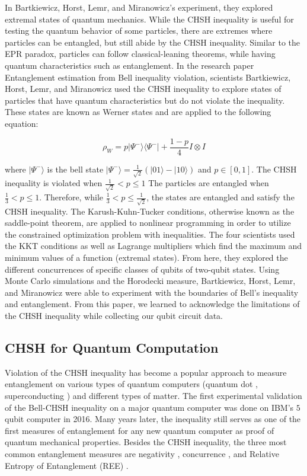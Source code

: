 \documentclass{article}
\begin{document}
In Bartkiewicz, Horst, Lemr, and Miranowicz’s experiment, they explored extremal states of quantum mechanics. While the CHSH inequality is useful for testing the quantum behavior of some particles, there are extremes where particles can be entangled, but still abide by the CHSH inequality. Similar to the EPR paradox, particles can follow classical-leaning theorems, while having quantum characteristics such as entanglement. 
In the research paper Entanglement estimation from Bell inequality violation, scientists Bartkiewicz, Horst, Lemr, and Miranowicz used the CHSH inequality to explore states of 
particles that have quantum characteristics but do not violate the inequality. These states are known as Werner states and are applied to the following equation: 

$$\rho_W = p|\Psi^-\rangle \langle\Psi^-| + \frac{1 - p}{4}I \otimes I$$

where $|\Psi^-\rangle$ is the bell state $|\Psi^-\rangle = \frac{1}{\sqrt{2}} (|01\rangle - |10\rangle)$ and $p \in [0,1]$. 
 The CHSH inequality is violated when 
$\frac{1}{\sqrt{2}} < p \leq 1$
The particles are entangled when 
$\frac{1}{3} < p \leq 1$.
Therefore, while $\frac{1}{3} < p \leq \frac{1}{\sqrt{2}}$, the states are entangled and satisfy the CHSH inequality. 
The Karush-Kuhn-Tucker conditions, otherwise known as the saddle-point theorem, are applied to nonlinear programming in order to utilize the constrained optimization problem with inequalities. The four scientists used the KKT conditions as well as Lagrange multipliers which find the maximum and minimum values of a function (extremal states). From here, they explored the different concurrences of specific classes of qubits of two-qubit states. Using Monte Carlo simulations and the Horodecki measure, Bartkiewicz, Horst, Lemr, and Miranowicz were able to experiment with the boundaries of Bell’s inequality and entanglement. 
From this paper, we learned to acknowledge the limitations of the CHSH inequality while collecting our qubit circuit data. 

\subsection{CHSH for Quantum Computation}

Violation of the CHSH inequality has become a popular approach to measure entanglement on various types of quantum computers (quantum dot \cite{steinacker2025bell}, superconducting \cite{storz2023loophole}) and different types of matter. The first experimental validation of the Bell-CHSH inequality on a major quantum computer was done on IBM’s $5$ qubit computer in 2016. Many years later, the inequality still serves as one of the first measures of entanglement for any new quantum computer as proof of quantum mechanical properties. Besides the CHSH inequality, the three most common entanglement measures are negativity \cite{PhysRevA.65.032314}, concurrence \cite{PhysRevLett.80.2245}, and Relative Entropy of Entanglement (REE) \cite{PhysRevLett.78.2275}.
\end{document}
